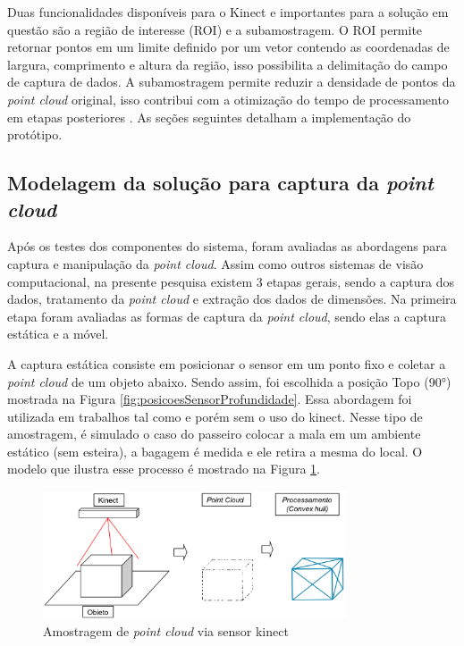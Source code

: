     Duas funcionalidades disponíveis para o Kinect e importantes para a solução em questão são a região de interesse (ROI) e a subamostragem. O ROI permite retornar pontos em um limite definido por um vetor contendo as coordenadas de largura, comprimento e altura da região, isso possibilita a delimitação do campo de captura de dados. A subamostragem permite reduzir a densidade de pontos da \textit{point cloud} original, isso contribui com a otimização do tempo de processamento em etapas posteriores \cite{mathworks_2015_point,mathworks_2017_acquire}. As seções seguintes detalham a implementação do protótipo.


\subsection{Modelagem da solução para captura da \textit{point cloud}}
\label{subsubsec_Modelagem da solucao}

    Após os testes dos componentes do sistema, foram avaliadas as abordagens para captura e manipulação da \textit{point cloud}. Assim como outros sistemas de visão computacional, na presente pesquisa existem 3 etapas gerais, sendo a captura dos dados, tratamento da \textit{point cloud} e extração dos dados de dimensões. Na primeira etapa foram avaliadas as formas de captura da \textit{point cloud}, sendo elas a captura estática e a móvel. 



    A captura estática consiste em posicionar o sensor em um ponto fixo e coletar a \textit{point cloud} de um objeto abaixo. Sendo assim, foi escolhida a posição Topo (90°) mostrada na Figura \ref{fig:posicoesSensorProfundidade}. Essa abordagem foi utilizada em trabalhos tal como \cite{gao_2013_baggage} e \cite{qingji_2018_method} porém sem o uso do kinect. Nesse tipo de amostragem, é simulado o caso do passeiro colocar a mala em um ambiente estático (sem esteira), a bagagem é medida e ele retira a mesma do local. O modelo que ilustra esse processo é mostrado na Figura \ref{fig:amostragem de point cloud de forma estatica}.
    
        \begin{figure}[h]
           \centering
           \includegraphics[width=0.8\textwidth]{imagens/amostragemEstaticaPtCloud.png} 
           \caption{Amostragem de \textit{point cloud} via sensor kinect}
          \label{fig:amostragem de point cloud de forma estatica}
        \end{figure}

